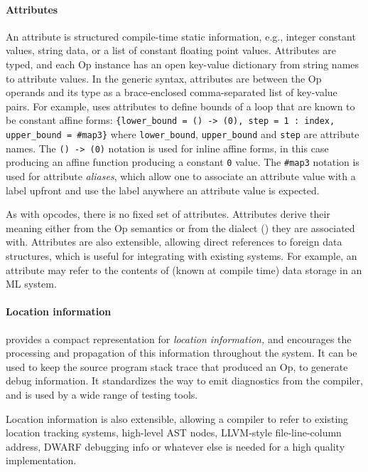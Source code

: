 \paragraph{Attributes}

An \MLIR attribute is structured compile-time static
information, e.g., integer constant values, string data,
or a list of constant floating point values.  Attributes are typed, and each
Op instance has an open key-value dictionary from string names to attribute
values. In the generic syntax, attributes are between the Op
operands and its type as a brace-enclosed comma-separated list of key-value
pairs. For example,  uses attributes to define bounds
of a loop that are known to be constant affine forms:
\lstinline|{lower_bound = () -> (0), step = 1 : index,|
\lstinline| upper_bound = #map3}| where \lstinline|lower_bound|,
\lstinline|upper_bound| and \lstinline|step| are attribute names.
The \lstinline|() -> (0)| notation is used for inline affine forms, in this
case producing an affine function producing a constant \lstinline|0| value.
The \lstinline|#map3| notation is used for attribute \emph{aliases}, which
allow one to associate an attribute value with a label upfront and use the
label anywhere an attribute value is expected.

As with opcodes, there is no fixed set of attributes.  Attributes derive their
meaning either from the Op semantics or from the dialect () they
are associated with.  Attributes are also extensible, allowing direct references
to foreign data structures, which is useful for integrating with existing systems.
For example, an attribute may refer to the contents of (known at compile time)
data storage in an ML system.

\paragraph{Location information}

\MLIR provides a compact representation for \emph{location information,}
and encourages the processing and propagation of this information
throughout the system.  It can be used to keep
the source program stack trace that produced an Op, to generate
debug information.  It standardizes the way to emit diagnostics from the compiler,
and is used by a wide range of testing tools.

Location information is also extensible, allowing a compiler to refer to
existing location tracking systems, high-level AST nodes, LLVM-style
file-line-column address, DWARF debugging info or whatever else is needed
for a high quality implementation.

